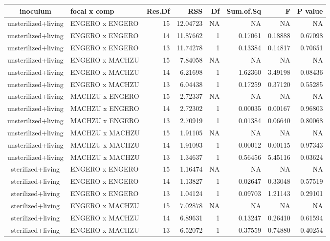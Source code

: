 \begin{table}[t]
\fontsize{12.0pt}{14.4pt}\selectfont
\begin{tabular*}{\linewidth}{@{\extracolsep{\fill}}clrrrrrr}
\toprule
inoculum & focal x comp & Res.Df & RSS & Df & Sum.of.Sq & F & P value \\ 
\midrule\addlinespace[2.5pt]
unsterilized+living & ENGERO x ENGERO & 15 & 12.04723 & NA & NA & NA & NA \\ 
unsterilized+living & ENGERO x ENGERO & 14 & 11.87662 & 1 & 0.17061 & 0.18888 & 0.67098 \\ 
unsterilized+living & ENGERO x ENGERO & 13 & 11.74278 & 1 & 0.13384 & 0.14817 & 0.70651 \\ 
unsterilized+living & ENGERO x MACHZU & 15 & 7.84058 & NA & NA & NA & NA \\ 
unsterilized+living & ENGERO x MACHZU & 14 & 6.21698 & 1 & 1.62360 & 3.49198 & 0.08436 \\ 
unsterilized+living & ENGERO x MACHZU & 13 & 6.04438 & 1 & 0.17259 & 0.37120 & 0.55285 \\ 
unsterilized+living & MACHZU x ENGERO & 15 & 2.72337 & NA & NA & NA & NA \\ 
unsterilized+living & MACHZU x ENGERO & 14 & 2.72302 & 1 & 0.00035 & 0.00167 & 0.96803 \\ 
unsterilized+living & MACHZU x ENGERO & 13 & 2.70919 & 1 & 0.01384 & 0.06640 & 0.80068 \\ 
unsterilized+living & MACHZU x MACHZU & 15 & 1.91105 & NA & NA & NA & NA \\ 
unsterilized+living & MACHZU x MACHZU & 14 & 1.91093 & 1 & 0.00012 & 0.00115 & 0.97343 \\ 
unsterilized+living & MACHZU x MACHZU & 13 & 1.34637 & 1 & 0.56456 & 5.45116 & 0.03624 \\ 
sterilized+living & ENGERO x ENGERO & 15 & 1.16474 & NA & NA & NA & NA \\ 
sterilized+living & ENGERO x ENGERO & 14 & 1.13827 & 1 & 0.02647 & 0.33048 & 0.57519 \\ 
sterilized+living & ENGERO x ENGERO & 13 & 1.04124 & 1 & 0.09703 & 1.21143 & 0.29101 \\ 
sterilized+living & ENGERO x MACHZU & 15 & 7.02878 & NA & NA & NA & NA \\ 
sterilized+living & ENGERO x MACHZU & 14 & 6.89631 & 1 & 0.13247 & 0.26410 & 0.61594 \\ 
sterilized+living & ENGERO x MACHZU & 13 & 6.52072 & 1 & 0.37559 & 0.74880 & 0.40254 \\ 

\end{tabular*}
\end{table}
